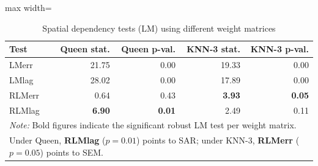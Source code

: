 \begin{table}[ht]
\centering
\caption{Spatial dependency tests (LM) using different weight matrices} 
\label{tab:lm_tests}
\begin{adjustbox}{max width=\linewidth}
\begin{tabular}{lrrrr}
  \toprule
Test & Queen stat. & Queen p-val. & KNN-3 stat. & KNN-3 p-val. \\ 
  \midrule
LMerr & 21.75 & 0.00 & 19.33 & 0.00 \\
  LMlag & 28.02 & 0.00 & 17.89 & 0.00 \\
  RLMerr & 0.64 & 0.43 & \textbf{3.93} & \textbf{0.05} \\
  RLMlag & \textbf{6.90} & \textbf{0.01} & 2.49 & 0.11 \\
   \bottomrule
\multicolumn{5}{l}{\footnotesize \textit{Note:} Bold figures indicate the significant robust LM test per weight matrix.}\\
\multicolumn{5}{l}{\footnotesize Under Queen, \textbf{RLMlag} ($p=0.01$) points to SAR; under KNN-3, \textbf{RLMerr} ($p=0.05$) points to SEM.}
\end{tabular}
\end{adjustbox}
\end{table}
